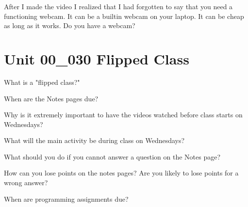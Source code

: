 \documentclass[letterpaper,12pt]{exam}
\newcommand{\unit}{Unit 00}
\begin{document}
\begin{questions}
\begin{samepage}
	\question After I made the video I realized that I had forgotten to say that you need a functioning webcam.  It can be a builtin webcam on your laptop.  It can be cheap as long as it works.  Do you have a webcam?
	\vspace{5mm}
\end{samepage}

\section*{\unit\_030 Flipped Class} %

\begin{samepage}
	\question What is a "flipped class?"
	\vspace{5mm}
\end{samepage}

\begin{samepage}
	\question When are the Notes pages due?
	\vspace{5mm}
\end{samepage}

\begin{samepage}
	\question Why is it extremely important to have the videos watched before class starts on Wednesdays?
	\vspace{5mm}
\end{samepage}

\begin{samepage}
	\question What will the main activity be during class on Wednesdays?
	\vspace{5mm}
\end{samepage}

\begin{samepage}
	\question What should you do if you cannot answer a question on the Notes page?
	\vspace{5mm}
\end{samepage}

\begin{samepage}
	\question How can you lose points on the notes pages?  Are you likely to lose points for a wrong answer?
	\vspace{5mm}
\end{samepage}

\begin{samepage}
	\question When are programming assignments due?
	\vspace{5mm}
\end{samepage}


\end{questions}
\end{document}
